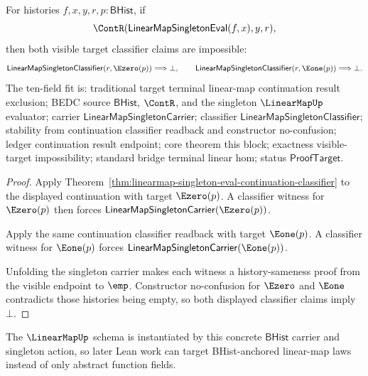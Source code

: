 \begin{theorem}
\label{thm:linearmap-singleton-eval-continuation-visible-target-exclusion}
For histories $f,x,y,r,p:\mathsf{BHist}$, if
$$
\ContR(\mathsf{LinearMapSingletonEval}(f,x),y,r),
$$
then both visible target classifier claims are impossible:
$$
\mathsf{LinearMapSingletonClassifier}(r,\Ezero(p))\Longrightarrow\bot,
\qquad
\mathsf{LinearMapSingletonClassifier}(r,\Eone(p))\Longrightarrow\bot.
$$
The ten-field fit is: traditional target terminal linear-map continuation
result exclusion; BEDC source $\mathsf{BHist}$, $\ContR$, and the singleton
$\LinearMapUp$ evaluator; carrier $\mathsf{LinearMapSingletonCarrier}$;
classifier $\mathsf{LinearMapSingletonClassifier}$; stability from
continuation classifier readback and constructor no-confusion; ledger
continuation result endpoint; core theorem this block; exactness visible-target
impossibility; standard bridge terminal linear hom; status
$\mathsf{ProofTarget}$.
\end{theorem}
\begin{proof}
Apply Theorem~\ref{thm:linearmap-singleton-eval-continuation-classifier} to
the displayed continuation with target $\Ezero(p)$. A classifier witness for
$\Ezero(p)$ then forces
$\mathsf{LinearMapSingletonCarrier}(\Ezero(p))$.

Apply the same continuation classifier readback with target $\Eone(p)$. A
classifier witness for $\Eone(p)$ forces
$\mathsf{LinearMapSingletonCarrier}(\Eone(p))$.

Unfolding the singleton carrier makes each witness a history-sameness proof
from the visible endpoint to $\emp$. Constructor no-confusion for $\Ezero$ and
$\Eone$ contradicts those histories being empty, so both displayed classifier
claims imply $\bot$.
\end{proof}

The $\LinearMapUp$ schema is instantiated by this concrete $\mathsf{BHist}$
carrier and singleton action, so later Lean work can target BHist-anchored
linear-map laws instead of only abstract function fields.
